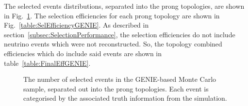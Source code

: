 \newline
\newline
The selected events distributions, separated into the prong topologies, are shown in Fig.~\ref{fig:ProngStackSelectedGENIE}.  The selection efficiencies for each prong topology are shown in Fig.~\ref{table:SelEfficiencyGENIE}.  As described in section~\ref{subsec:SelectionPerformance}, the selection efficiencies do not include neutrino events which were not reconstructed.  So, the topology combined efficiencies which do include said events are shown in table~\ref{table:FinalEffGENIE}.
\begin{figure}
  \centering
  \caption{The number of selected events in the GENIE-based Monte Carlo sample, separated out into the prong topologies.  Each event is categorised by the associated truth information from the simulation.}
  \label{fig:ProngStackSelectedGENIE}
\end{figure}
